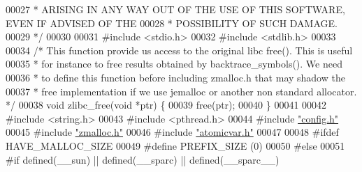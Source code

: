 \begin{DoxyCode}
00027 \textcolor{comment}{ * ARISING IN ANY WAY OUT OF THE USE OF THIS SOFTWARE, EVEN IF ADVISED OF THE}
00028 \textcolor{comment}{ * POSSIBILITY OF SUCH DAMAGE.}
00029 \textcolor{comment}{ */}
00030 
00031 \textcolor{preprocessor}{#}\textcolor{preprocessor}{include} \textcolor{preprocessor}{<}\textcolor{preprocessor}{stdio}\textcolor{preprocessor}{.}\textcolor{preprocessor}{h}\textcolor{preprocessor}{>}
00032 \textcolor{preprocessor}{#}\textcolor{preprocessor}{include} \textcolor{preprocessor}{<}\textcolor{preprocessor}{stdlib}\textcolor{preprocessor}{.}\textcolor{preprocessor}{h}\textcolor{preprocessor}{>}
00033 
00034 \textcolor{comment}{/* This function provide us access to the original libc free(). This is useful}
00035 \textcolor{comment}{ * for instance to free results obtained by backtrace\_symbols(). We need}
00036 \textcolor{comment}{ * to define this function before including zmalloc.h that may shadow the}
00037 \textcolor{comment}{ * free implementation if we use jemalloc or another non standard allocator. */}
00038 \textcolor{keywordtype}{void} zlibc\_free(\textcolor{keywordtype}{void} *ptr) \{
00039     free(ptr);
00040 \}
00041 
00042 \textcolor{preprocessor}{#}\textcolor{preprocessor}{include} \textcolor{preprocessor}{<}\textcolor{preprocessor}{string}\textcolor{preprocessor}{.}\textcolor{preprocessor}{h}\textcolor{preprocessor}{>}
00043 \textcolor{preprocessor}{#}\textcolor{preprocessor}{include} \textcolor{preprocessor}{<}\textcolor{preprocessor}{pthread}\textcolor{preprocessor}{.}\textcolor{preprocessor}{h}\textcolor{preprocessor}{>}
00044 \textcolor{preprocessor}{#}\textcolor{preprocessor}{include} \hyperlink{config_8h}{"config.h"}
00045 \textcolor{preprocessor}{#}\textcolor{preprocessor}{include} \hyperlink{zmalloc_8h}{"zmalloc.h"}
00046 \textcolor{preprocessor}{#}\textcolor{preprocessor}{include} \hyperlink{atomicvar_8h}{"atomicvar.h"}
00047 
00048 \textcolor{preprocessor}{#}\textcolor{preprocessor}{ifdef} \textcolor{preprocessor}{HAVE\_MALLOC\_SIZE}
00049 \textcolor{preprocessor}{#}\textcolor{preprocessor}{define} \textcolor{preprocessor}{PREFIX\_SIZE} \textcolor{preprocessor}{(}0\textcolor{preprocessor}{)}
00050 \textcolor{preprocessor}{#}\textcolor{preprocessor}{else}
00051 \textcolor{preprocessor}{#}\textcolor{preprocessor}{if} \textcolor{preprocessor}{defined}\textcolor{preprocessor}{(}\textcolor{preprocessor}{\_\_sun}\textcolor{preprocessor}{)} \textcolor{preprocessor}{||} \textcolor{preprocessor}{defined}\textcolor{preprocessor}{(}\textcolor{preprocessor}{\_\_sparc}\textcolor{preprocessor}{)} \textcolor{preprocessor}{||} \textcolor{preprocessor}{defined}\textcolor{preprocessor}{(}\textcolor{preprocessor}{\_\_sparc\_\_}\textcolor{preprocessor}{)}

\end{DoxyCode}

